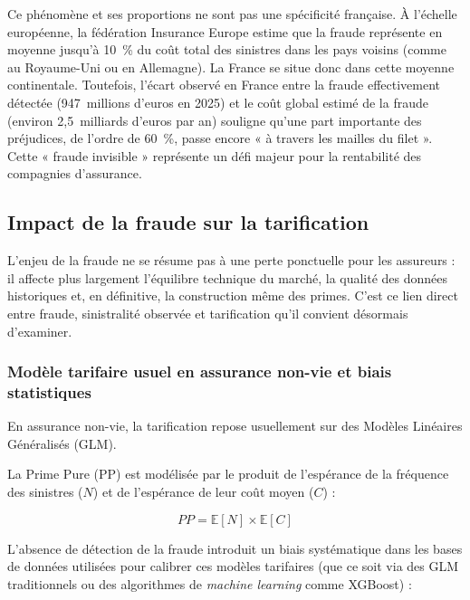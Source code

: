 Ce phénomène et ses proportions ne sont pas une spécificité française. À l'échelle européenne, la fédération Insurance Europe estime que la fraude représente en moyenne jusqu'à 10~\% du coût total des sinistres dans les pays voisins (comme au Royaume-Uni ou en Allemagne). La France se situe donc dans cette moyenne continentale. Toutefois, l'écart observé en France entre la fraude effectivement détectée (947~millions d'euros en 2025) et le coût global estimé de la fraude (environ 2,5~milliards d'euros par an) souligne qu'une part importante des préjudices, de l'ordre de 60~\%, passe encore « à travers les mailles du filet ». Cette « fraude invisible » représente un défi majeur pour la rentabilité des compagnies d'assurance.

\subsection{Impact de la fraude sur la tarification}

L'enjeu de la fraude ne se résume pas à une perte ponctuelle pour les assureurs : il affecte plus largement l'équilibre technique du marché, la qualité des données historiques et, en définitive, la construction même des primes. C'est ce lien direct entre fraude, sinistralité observée et tarification qu'il convient désormais d'examiner.

\subsubsection{Modèle tarifaire usuel en assurance non-vie et biais statistiques}

En assurance non-vie, la tarification repose usuellement sur des Modèles Linéaires Généralisés (GLM).

La Prime Pure (PP) est modélisée par le produit de l'espérance de la fréquence des sinistres ($N$) et de l'espérance de leur coût moyen ($C$) :

\begin{equation}
    PP = \mathbb{E}[N] \times \mathbb{E}[C]
\end{equation}

L'absence de détection de la fraude introduit un biais systématique dans les bases de données utilisées pour calibrer ces modèles tarifaires (que ce soit via des GLM traditionnels ou des algorithmes de \textit{machine learning} comme XGBoost) :

